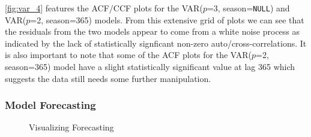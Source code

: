 \documentclass{article}\usepackage[]{graphicx}\usepackage[]{color}
\newenvironment{knitrout}{}{} %
\begin{document}
\begin{landscape}
\begin{knitrout}
\end{knitrout}

\autoref{fig:var_4} features the ACF/CCF plots for the VAR($p$=3, season=\texttt{NULL}) and VAR($p$=2, season=365) models. From this extensive grid of plots we can see that the residuals from the two models appear to come from a white noise process as indicated by the lack of statistically signficant non-zero auto/cross-correlations. It is also important to note that some of the ACF plots for the VAR($p$=2, season=365) model have a slight statistically significant value at lag 365 which suggests the data still needs some further manipulation.
\end{landscape}

\subsubsection*{Model Forecasting}
\vspace{-20 pt}

\begin{knitrout}
\color{fgcolor}\begin{figure}[H]

{\centering {}

}

\caption[Visualizing Forecasting]{Visualizing Forecasting}\label{fig:var_5}
\end{figure}


\end{knitrout}
\end{document}

